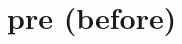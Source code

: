 \chapter{pre (before)}

\begin{vocabulary}[precede]
\end{vocabulary}

\begin{vocabulary}[previous]
\end{vocabulary}

\begin{vocabulary}
\end{vocabulary}
